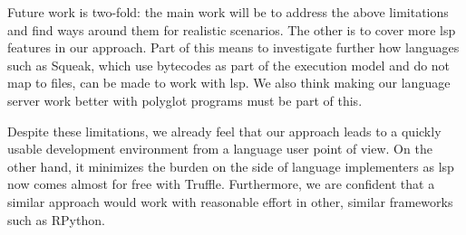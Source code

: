 \documentclass[sigplan,10pt,review,anonymous]{acmart}
\begin{document}

Future work is two-fold: the main work will be to address the above limitations
and find ways around them for realistic scenarios. The other is to cover more
\ac{lsp} features in our approach. Part of this means to investigate further how
languages such as Squeak, which use bytecodes as part of the execution model and
do not map to files, can be made to work with \ac{lsp}. We also think making our
language server work better with polyglot programs must be part of this.

Despite these limitations, we already feel that our approach leads to a quickly
usable development environment from a language user point of view.
On the other hand, it minimizes the burden on the side of language implementers
as \ac{lsp} now comes almost for free with Truffle.
Furthermore, we are confident that a similar approach would work with reasonable
effort in other, similar frameworks such as RPython.


\end{document}
